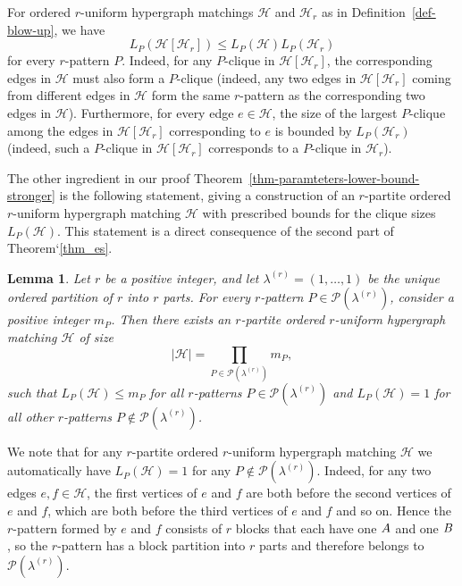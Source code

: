 \documentclass[11pt]{article}
\newtheorem{lemma}[theorem]{Lemma}
\theoremstyle{definition}
\numberwithin{equation}{section}
\numberwithin{figure}{section}
\newcommand{\HH}{\mathcal{H}}
\newcommand{\PP}{\mathcal{P}}
\begin{document}
For ordered $r$-uniform hypergraph matchings $\HH$ and $\HH_r$ as in Definition~\ref{def-blow-up}, we have
\begin{equation}\label{Lp}
L_P(\HH[\HH_r]) \le L_P(\HH) L_P(\HH_r)
\end{equation}
for every $r$-pattern $P$. Indeed, for any $P$-clique in $\HH[\HH_r]$, the corresponding edges in $\HH$ must also form a $P$-clique (indeed, any two edges in $\HH[\HH_r]$ coming from different edges in $\HH$ form the same $r$-pattern as the corresponding two edges in $\HH$). Furthermore, for every edge $e\in \HH$, the size of the largest $P$-clique among the edges in $\HH[\HH_r]$ corresponding to $e$ is bounded by $L_P(\HH_r)$ (indeed, such a $P$-clique in $\HH[\HH_r]$ corresponds to a $P$-clique in $\HH_r$).

The other ingredient in our proof Theorem~\ref{thm-paramteters-lower-bound-stronger} is the following statement, giving a construction of an $r$-partite ordered $r$-uniform hypergraph matching $\HH$ with prescribed bounds for the clique sizes $L_P(\HH)$. This statement is a direct consequence of the second part of Theorem`\ref{thm_es}.

\begin{lemma}\label{obs-construction-partite}
    Let $r$ be a positive integer, and let $\lambda^{(r)}=(1,\dots,1)$ be the unique ordered partition of $r$ into $r$ parts. For every $r$-pattern $P\in \PP(\lambda^{(r)})$, consider a positive integer $m_P$. Then there exists an $r$-partite ordered $r$-uniform hypergraph matching $\HH$ of size
\[|\HH|=\prod_{P\in \PP(\lambda^{(r)})} m_{P},\]
such that $L_P(\HH)\le m_P$ for all $r$-patterns $P\in \PP(\lambda^{(r)})$ and $L_P(\HH)=1$ for all other $r$-patterns $P\not\in \PP(\lambda^{(r)})$.
\end{lemma}

We note that for any $r$-partite ordered $r$-uniform hypergraph matching $\HH$ we automatically have $L_{P}(\HH)=1$ for any $P\not\in \PP(\lambda^{(r)})$. Indeed, for any two edges $e,f\in \HH$, the first vertices of $e$ and $f$ are both before the second vertices of $e$ and $f$, which are both before the third vertices of $e$ and $f$ and so on. Hence the $r$-pattern formed by $e$ and $f$ consists of $r$ blocks that each have one $\rm A$ and one $\rm B$, so the $r$-pattern has a block partition into $r$ parts and therefore belongs to $\PP(\lambda^{(r)})$.
\end{document}
